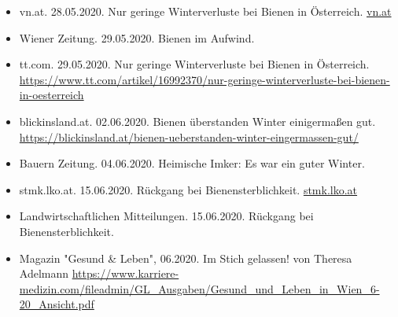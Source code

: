 \begin{itemize}
    \item
    vn.at. 28.05.2020. Nur geringe Winterverluste bei Bienen in Österreich. \href{https://www.vn.at/newsticker/nur-geringe-winterverluste-bei-bienen-in-oesterreich/1852978}{vn.at}
    
    \item
    Wiener Zeitung. 29.05.2020. Bienen im Aufwind.
    
    \item
    tt.com. 29.05.2020. Nur geringe Winterverluste bei Bienen in Österreich. \url{https://www.tt.com/artikel/16992370/nur-geringe-winterverluste-bei-bienen-in-oesterreich}
    
    \item
    blickinsland.at. 02.06.2020. Bienen überstanden Winter einigermaßen gut. \url{https://blickinsland.at/bienen-ueberstanden-winter-eingermassen-gut/}
    
    \item
    Bauern Zeitung. 04.06.2020. Heimische Imker: Es war ein guter Winter. 
    
    \item
    stmk.lko.at. 15.06.2020. Rückgang bei Bienensterblichkeit.
    \href{https://stmk.lko.at/landwirtschaftliche-mitteilungen-vom-15-juni-2020+2500+3228498}{stmk.lko.at}
    
    \item
    Landwirtschaftlichen Mitteilungen. 15.06.2020. Rückgang bei Bienensterblichkeit.
    
    \item
    Magazin "Gesund \& Leben", 06.2020. Im Stich gelassen! von Theresa Adelmann \url{https://www.karriere-medizin.com/fileadmin/GL_Ausgaben/Gesund_und_Leben_in_Wien_6-20_Ansicht.pdf}

\end{itemize}